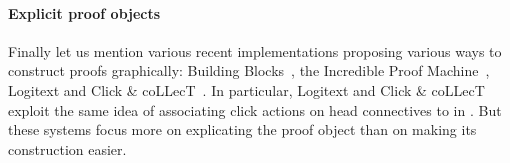 

\paragraph{Explicit proof objects}

Finally let us mention various recent implementations proposing various ways to
construct proofs graphically: Building Blocks~, the
Incredible Proof Machine~,
Logitext and Click \&
coLLecT~. In particular, Logitext and Click \& coLLecT
exploit the same idea of associating click actions on head connectives to
 in . But these systems focus more on explicating
the proof object than on making its construction easier.